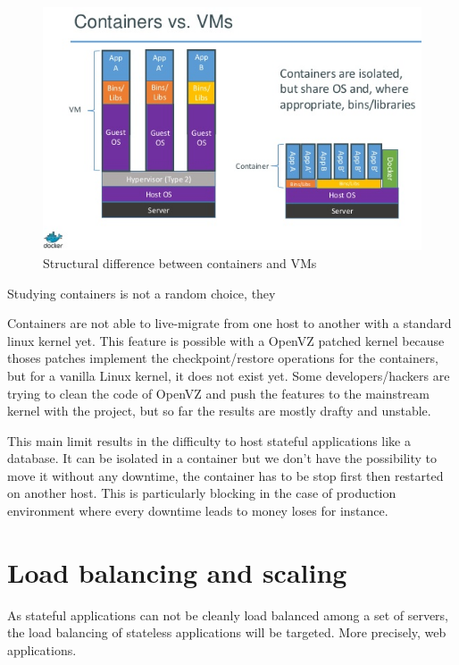\begin{figure}
	\includegraphics{./Images/containers_vs_vms.png}
	\caption{Structural difference between containers and VMs}
\end{figure}


Studying containers is not a random choice, they


Containers are not able to live-migrate from one host to another with a
standard linux kernel yet. This feature is possible with a OpenVZ patched
kernel because thoses patches implement the checkpoint/restore operations for
the containers, but for a vanilla Linux kernel, it does not exist yet. Some
developers/hackers are trying to clean the code of OpenVZ and push the features
to the mainstream kernel with the \cite{websiteCRIU} project, but so far the
results are mostly drafty and unstable.

This main limit results in the difficulty to host stateful applications like a
database. It can be isolated in a container but we don't have the possibility
to move it without any downtime, the container has to be stop first then
restarted on another host. This is particularly blocking in the case of
production environment where every downtime leads to money loses for instance.

\section{Load balancing and scaling}

As stateful applications can not be cleanly load balanced among a set of
servers, the load balancing of stateless applications will be targeted. More
precisely, web applications.

